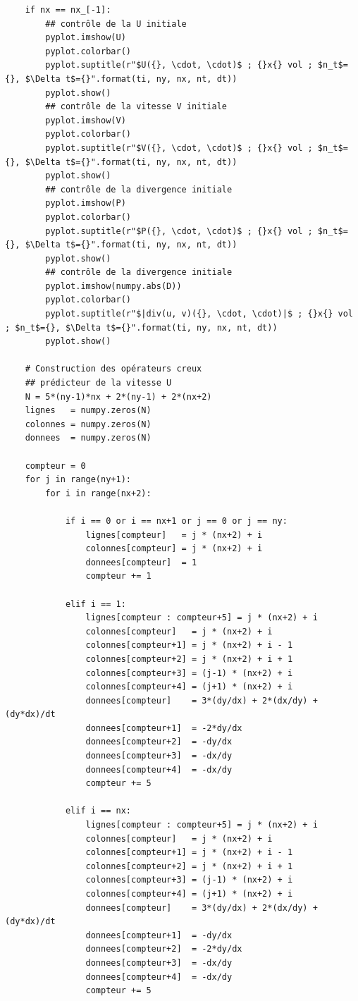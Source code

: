 \begin{verbatim}
    if nx == nx_[-1]:
        ## contrôle de la U initiale
        pyplot.imshow(U)
        pyplot.colorbar()
        pyplot.suptitle(r"$U({}, \cdot, \cdot)$ ; {}x{} vol ; $n_t$={}, $\Delta t$={}".format(ti, ny, nx, nt, dt))
        pyplot.show()
        ## contrôle de la vitesse V initiale
        pyplot.imshow(V)
        pyplot.colorbar()
        pyplot.suptitle(r"$V({}, \cdot, \cdot)$ ; {}x{} vol ; $n_t$={}, $\Delta t$={}".format(ti, ny, nx, nt, dt))
        pyplot.show()
        ## contrôle de la divergence initiale
        pyplot.imshow(P)
        pyplot.colorbar()
        pyplot.suptitle(r"$P({}, \cdot, \cdot)$ ; {}x{} vol ; $n_t$={}, $\Delta t$={}".format(ti, ny, nx, nt, dt))
        pyplot.show()
        ## contrôle de la divergence initiale
        pyplot.imshow(numpy.abs(D))
        pyplot.colorbar()
        pyplot.suptitle(r"$|div(u, v)({}, \cdot, \cdot)|$ ; {}x{} vol ; $n_t$={}, $\Delta t$={}".format(ti, ny, nx, nt, dt))
        pyplot.show()
    
    # Construction des opérateurs creux
    ## prédicteur de la vitesse U
    N = 5*(ny-1)*nx + 2*(ny-1) + 2*(nx+2)
    lignes   = numpy.zeros(N)
    colonnes = numpy.zeros(N)
    donnees  = numpy.zeros(N)

    compteur = 0
    for j in range(ny+1):
        for i in range(nx+2):
                
            if i == 0 or i == nx+1 or j == 0 or j == ny:
                lignes[compteur]   = j * (nx+2) + i
                colonnes[compteur] = j * (nx+2) + i
                donnees[compteur]  = 1
                compteur += 1
   
            elif i == 1:
                lignes[compteur : compteur+5] = j * (nx+2) + i
                colonnes[compteur]   = j * (nx+2) + i
                colonnes[compteur+1] = j * (nx+2) + i - 1
                colonnes[compteur+2] = j * (nx+2) + i + 1
                colonnes[compteur+3] = (j-1) * (nx+2) + i
                colonnes[compteur+4] = (j+1) * (nx+2) + i
                donnees[compteur]    = 3*(dy/dx) + 2*(dx/dy) + (dy*dx)/dt
                donnees[compteur+1]  = -2*dy/dx
                donnees[compteur+2]  = -dy/dx
                donnees[compteur+3]  = -dx/dy
                donnees[compteur+4]  = -dx/dy
                compteur += 5
            
            elif i == nx:
                lignes[compteur : compteur+5] = j * (nx+2) + i
                colonnes[compteur]   = j * (nx+2) + i
                colonnes[compteur+1] = j * (nx+2) + i - 1
                colonnes[compteur+2] = j * (nx+2) + i + 1
                colonnes[compteur+3] = (j-1) * (nx+2) + i
                colonnes[compteur+4] = (j+1) * (nx+2) + i
                donnees[compteur]    = 3*(dy/dx) + 2*(dx/dy) + (dy*dx)/dt
                donnees[compteur+1]  = -dy/dx
                donnees[compteur+2]  = -2*dy/dx
                donnees[compteur+3]  = -dx/dy
                donnees[compteur+4]  = -dx/dy
                compteur += 5


\end{verbatim}
